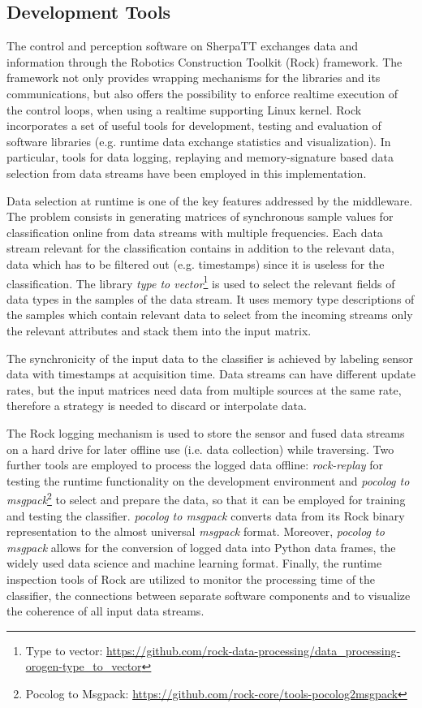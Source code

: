\subsection{Development Tools}

The control and perception software on SherpaTT exchanges data and information through the Robotics Construction Toolkit (Rock) framework. 
The framework not only provides wrapping mechanisms for the libraries and its communications, but also offers the possibility to enforce realtime execution of the control loops, when using a realtime supporting Linux kernel. 
Rock incorporates a set of useful tools for development, testing and evaluation of software libraries (e.g. runtime data exchange statistics and visualization). 
In particular, tools for data logging, replaying and memory-signature based data selection from data streams have been employed in this implementation. 

Data selection at runtime is one of the key features addressed by the middleware. 
The problem consists in generating matrices of synchronous sample values for classification online from data streams with multiple frequencies.
Each data stream relevant for the classification contains in addition to the relevant data, data which has to be filtered out (e.g. timestamps) since it is useless for the classification.
The library \emph{type to vector}\footnote{Type to vector: \url{https://github.com/rock-data-processing/data_processing-orogen-type_to_vector}} is used to select the relevant fields of data types in the samples of the data stream. 
It uses memory type descriptions of the samples which contain relevant data to select from the incoming streams only the relevant attributes and stack them into the input matrix. 

The synchronicity of the input data to the classifier is achieved by labeling sensor data with timestamps at acquisition time.
Data streams can have different update rates, but the input matrices need data from multiple sources at the same rate, therefore a strategy is needed to discard or interpolate data. 

The Rock logging mechanism is used to store the sensor and fused data streams on a hard drive for later offline use (i.e. data collection) while traversing. 
Two further tools are employed to process the logged data offline: \emph{rock-replay} for testing the runtime functionality on the development environment and \emph{pocolog to msgpack}\footnote{Pocolog to Msgpack: \url{https://github.com/rock-core/tools-pocolog2msgpack}} to select and prepare the data, so that it can be employed for training and testing the classifier.
\emph{pocolog to msgpack} converts data from its Rock binary representation to the almost universal \emph{msgpack} format.
Moreover, \emph{pocolog to msgpack} allows for the conversion of logged data into Python data frames, the widely used data science and machine learning format. 
Finally, the runtime inspection tools of Rock are utilized to monitor the processing time of the classifier, the connections between separate software components and to visualize the coherence of all input data streams. 

